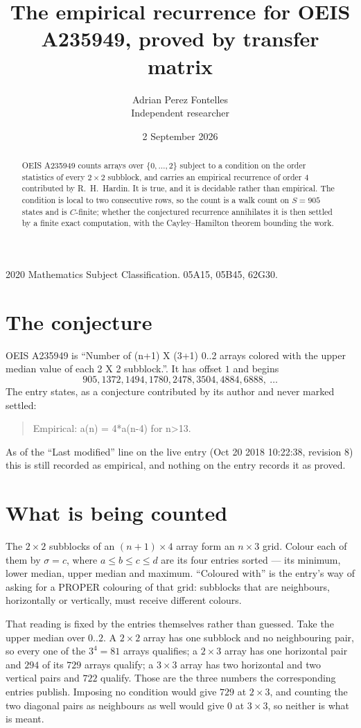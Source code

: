 \documentclass[11pt,a4paper]{article}
\title{The empirical recurrence for OEIS A235949, proved by transfer matrix}
\author{Adrian Perez Fontelles\\ \small Independent researcher}
\date{2 September 2026}
\theoremstyle{plain}
\theoremstyle{definition}
\begin{document}
\maketitle

\begin{abstract}
OEIS A235949 counts arrays over $\{0,\dots,2\}$ subject to a condition on the order
statistics of every $2\times2$ subblock, and carries an empirical recurrence of order
$4$ contributed by R.~H.~Hardin. It is true, and it is decidable rather than empirical.
The condition is local to two consecutive rows, so the count is a walk count on $S=905$
states and is $C$-finite; whether the conjectured recurrence annihilates it is then settled by
a finite exact computation, with the Cayley--Hamilton theorem bounding the work.
\end{abstract}

\noindent\small 2020 Mathematics Subject Classification. 05A15, 05B45, 62G30.\normalsize

\section{The conjecture}

OEIS A235949 is ``Number of (n+1) X (3+1) 0..2 arrays colored with the upper median value of each 2 X 2 subblock.''. It has offset $1$ and begins
\[
905, 1372, 1494, 1780, 2478, 3504, 4884, 6888,\ \dots
\]
The entry states, as a conjecture contributed by its author and never marked settled:
\begin{quote}
Empirical: a(n) = 4*a(n-4) for n>13.
\end{quote}
As of the ``Last modified'' line on the live entry (Oct 20 2018 10:22:38, revision 8) this is still
recorded as empirical, and nothing on the entry records it as proved.

\section{What is being counted}

The $2\times2$ subblocks of an $(n+1)\times4$ array form an
$n\times3$ grid. Colour each of them by $\sigma=c$, where $a\le b\le c\le d$ are its four entries sorted --- its minimum, lower median, upper median and maximum. ``Coloured with'' is the entry's way of
asking for a PROPER colouring of that grid: subblocks that are neighbours, horizontally or
vertically, must receive different colours.

That reading is fixed by the entries themselves rather than guessed. Take the upper median
over $0..2$. A $2\times2$ array has one subblock and no neighbouring pair, so every one of the
$3^4=81$ arrays qualifies; a $2\times3$ array has one horizontal pair and $294$ of its $729$
arrays qualify; a $3\times3$ array has two horizontal and two vertical pairs and $722$
qualify. Those are the three numbers the corresponding entries publish. Imposing no condition
would give $729$ at $2\times3$, and counting the two diagonal pairs as neighbours as well
would give $0$ at $3\times3$, so neither is what is meant.
\end{document}
